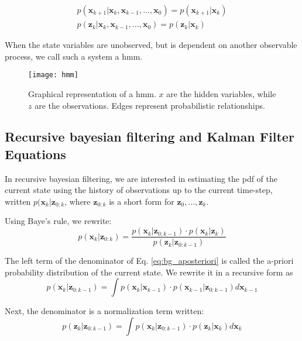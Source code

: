 \begin{align}
  p(\bm{x}_{k+1}|\bm{x}_{k}, \bm{x}_{k-1},\ldots,\bm{x}_{0})=p(\bm{x}_{k+1}|\bm{x}_{k})\\
  p(\bm{z}_{k}|\bm{x}_{k}, \bm{x}_{k-1},\ldots,\bm{x}_{0})=p(\bm{z}_{k}|\bm{x}_{k})
\end{align}

When the state variables are unobserved, but is dependent on another observable process, we call such a system a \gls{hmm}.

\begin{figure}[!htpb]
  \centering
  \texttt{[image: hmm]}
  \caption{Graphical representation of a \gls{hmm}. $x$ are the hidden variables, while $z$ are the observations.
  Edges represent probabilistic relationships.}
  \label{fig:hmm}
\end{figure}

\subsection{Recursive bayesian filtering and Kalman Filter Equations}
In recursive bayesian filtering, we are interested in estimating the \gls{pdf} of the current state using the history of observations up to the current time-step, written $p(\bm{x}_{k}|\bm{z}_{0:k}$, where $\bm{z}_{0:k}$ is a short form for $\bm{z}_{0},\ldots, \bm{z}_{k}$.

Using Baye's rule, we rewrite:
\begin{equation}
  \label{eq:bg_aposteriori}
  p(\bm{x}_{k}|\bm{z}_{0:k}) = \frac{p(\bm{x}_{k}|\bm{z}_{0:k-1})\cdot p(\bm{x}_{k}|\bm{z}_{k})}{p(\bm{z}_{k}|\bm{z}_{0:k-1})}
\end{equation}

The left term of the denominator of Eq. \ref{eq:bg_aposteriori} is called the a-priori probability distribution of the current state.
We rewrite it in a recursive form as
\begin{equation}
  \label{eq:bg_prior}
  p(\bm{x}_{k}|\bm{z}_{0:k-1}) = \int p(\bm{x}_{k}|\bm{x}_{k-1}) \cdot p(\bm{x}_{k-1}|\bm{z}_{0:k-1}) d\bm{x}_{k-1}
\end{equation}

Next, the denominator is a normalization term written:
\begin{equation}
  \label{eq:bg_norm_cst}
  p(\bm{z}_{k}|\bm{z}_{0:k-1}) = \int p(\bm{x}_{k}|\bm{z}_{0:k-1}) \cdot p(\bm{z}_{k}|\bm{x}_{k}) d\bm{x}_{k}
\end{equation}

